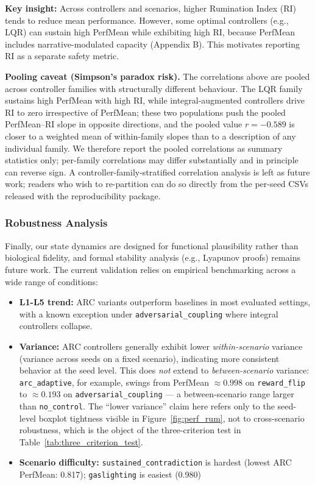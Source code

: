 \documentclass{article}
\begin{document}
\textbf{Key insight:} Across controllers and scenarios, higher Rumination Index (RI) tends to reduce mean performance. However, some optimal controllers (e.g., LQR) can sustain high PerfMean while exhibiting high RI, because PerfMean includes narrative-modulated capacity (Appendix B). This motivates reporting RI as a separate safety metric.

\textbf{Pooling caveat (Simpson's paradox risk).} The correlations above are pooled across controller families with structurally different behaviour. The LQR family sustains high PerfMean with high RI, while integral-augmented controllers drive RI to zero irrespective of PerfMean; these two populations push the pooled PerfMean--RI slope in opposite directions, and the pooled value $r=-0.589$ is closer to a weighted mean of within-family slopes than to a description of any individual family. We therefore report the pooled correlations as summary statistics only; per-family correlations may differ substantially and in principle can reverse sign. A controller-family-stratified correlation analysis is left as future work; readers who wish to re-partition can do so directly from the per-seed CSVs released with the reproducibility package.

\subsubsection{Robustness Analysis}
Finally, our state dynamics are designed for functional plausibility rather than biological fidelity, and formal stability analysis (e.g., Lyapunov proofs) remains future work. The current validation relies on empirical benchmarking across a wide range of conditions:
\begin{itemize}
    \item \textbf{L1-L5 trend:} ARC variants outperform baselines in most evaluated settings, with a known exception under \texttt{adversarial\_coupling} where integral controllers collapse.
    \item \textbf{Variance:} ARC controllers generally exhibit lower \emph{within-scenario} variance (variance across seeds on a fixed scenario), indicating more consistent behavior at the seed level. This does \emph{not} extend to \emph{between-scenario} variance: \texttt{arc\_adaptive}, for example, swings from PerfMean $\approx 0.998$ on \texttt{reward\_flip} to $\approx 0.193$ on \texttt{adversarial\_coupling} --- a between-scenario range larger than \texttt{no\_control}. The ``lower variance'' claim here refers only to the seed-level boxplot tightness visible in Figure~\ref{fig:perf_rum}, not to cross-scenario robustness, which is the object of the three-criterion test in Table~\ref{tab:three_criterion_test}.
    \item \textbf{Scenario difficulty:} \texttt{sustained\_contradiction} is hardest (lowest ARC PerfMean: 0.817); \texttt{gaslighting} is easiest (0.980)
\end{itemize}
\end{document}
